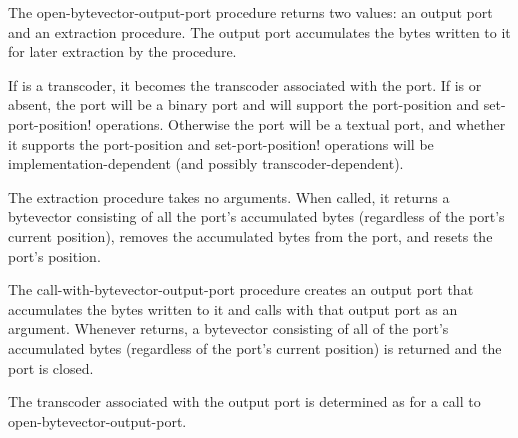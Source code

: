 \begin{entry}{%
}


The {\cf open-bytevector-output-port} procedure returns 
two values: an output port and an extraction procedure.
The output port accumulates the bytes written to it for
later extraction by the procedure.

If  is a transcoder, it becomes
the transcoder associated with the port.
If  is \schfalse{} or absent,
the port will be a binary port and will support the
{\cf port-position} and {\cf set-port-position!}  operations.
Otherwise the port will be a textual port, and whether it supports
the {\cf port-position} and {\cf set-port-position!} operations
will be implementation-dependent (and possibly transcoder-dependent).

The extraction procedure takes no arguments.
When called, it returns a
bytevector consisting of all the port's accumulated bytes (regardless
of the port's current position), removes
the accumulated bytes from the port, and resets the port's position.
\end{entry}

\begin{entry}{%
}


The {\cf call-with-bytevector-output-port} procedure creates an output
port that accumulates the bytes written to it and calls  with
that output port as an argument. Whenever  returns, a
bytevector consisting of all of the port's accumulated bytes (regardless
of the port's current position) is returned and
the port is closed.

The transcoder associated with the output port is determined
as for a call to {\cf open-bytevector-output-port}.
\end{entry}

